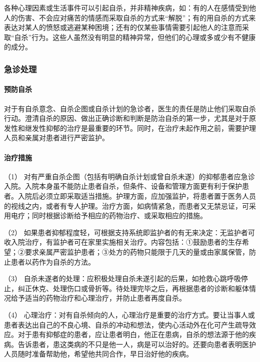 各种心理因素或生活事件可以引起自杀，并非精神疾病，如：有的人在感情受到他人的伤害、不会应对痛苦的情感而采取自杀的方式来“解脱”；有的用自杀的方式来表达对某人的愤怒或逃避某种困境；还有的仅某些事情需要引起他人的注意而采取“自杀”行为。这些人虽然没有明显的精神异常，但他们的心理或多或少有不健康的成分。

\subsubsection{急诊处理}

\paragraph{预防自杀}

对于有自杀意念、自杀企图或自杀计划的急诊者，医生的责任是防止他们采取自杀行动。澄清自杀的原因、做出正确诊断和判断是防治自杀的第一步，尤其是对于原发性和继发性抑郁的治疗是最重要的环节。同时，在治疗未起作用之前，需要护理人员和亲属对患者进行严密监护。

\paragraph{治疗措施}

（1）
对有严重自杀企图（包括有明确自杀计划或曾自杀未遂）的抑郁患者应急诊入院。入院本身虽不能防止患者自杀，但条件、设备和管理方面更有利于保护患者。入院后必须立即采取适当措施。护理方面，应加强监护，将患者置于医务人员的视线之内，或者有专人护理。治疗方面，如病情紧急，而患者又无禁忌证，可采用电疗；同时根据诊断给予相应的药物治疗、或采取相应的措施。

（2）
如果患者抑郁程度轻，可根据支持系统即监护者的有无来决定：无监护者可收入院治疗，有监护者可在家里实施相关治疗。内容包括：①鼓励患者的生存希望；②要求亲属严密监护患者；③处方的药物只能限于几天的量或由家属保管，防止患者以药作为自杀的方法。

（3）
自杀未遂者的处理：应积极处理自杀未遂引起的后果，如抢救心跳呼吸停止，纠正休克、处理伤口或骨折等。待处理完毕之后，再根据患者的诊断和躯体情况给予适当的药物治疗和心理治疗，并防止患者再度自杀。

（4）
心理治疗：对有自杀倾向的人，心理治疗是重要的治疗方式。要让当事人或患者表达出自己的不良心境、自杀的冲动和想法，使内心活动外在化可产生疏导效应。对于患有抑郁症的患者，应让患者明白，他正在患病，自杀的想法源于他的疾病。告诉患者，患这类病的不只是他一人，病是可以治好的。还要向患者表明医护人员随时准备帮助他，希望他共同合作，早日治好他的疾病。

\protect\hypertarget{text00053.html}{}{}


